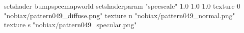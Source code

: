 setshader bumpspecmapworld
setshaderparam "specscale" 1.0 1.0 1.0
   texture 0 "nobiax/pattern049_diffuse.png"
   texture n "nobiax/pattern049_normal.png"
   texture s "nobiax/pattern049_specular.png"